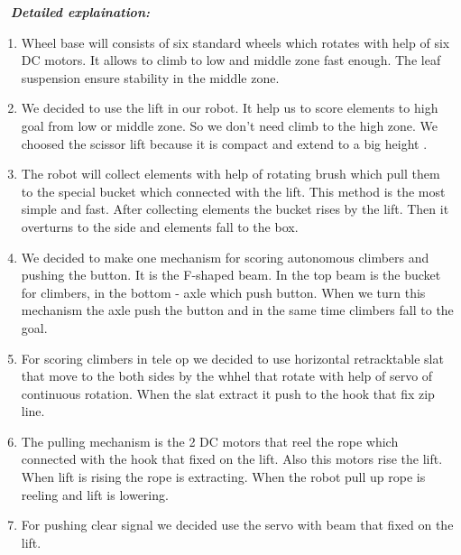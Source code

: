  \newline
\textit{\textbf{Detailed explaination:}}
\begin{enumerate}
	\item Wheel base will consists of six standard wheels which rotates with help of six DC motors. It allows to climb to low and middle zone fast enough. The leaf suspension ensure stability in the middle zone.
	
	\item We decided to use the lift in our robot. It help us to score elements to high goal from low or middle zone. So we don't need climb to the high zone. We choosed the scissor lift because it is compact and extend to a big height .
	
	\item The robot will collect elements with help of rotating brush which pull them to the special bucket which connected with the lift. This method is the most simple and fast. After collecting elements the bucket rises by the lift. Then it overturns to the side and elements fall to the box.
	
	\item We decided to make one mechanism for scoring autonomous climbers and pushing the button. It is the F-shaped beam. In the top beam is the bucket for climbers, in the bottom - axle which push button. When we turn this mechanism the axle push the button and in the same time climbers fall to the goal.
	
	\item For scoring climbers in tele op we decided to use horizontal retracktable slat that move to the both sides by the whhel that rotate with help of servo of continuous rotation. When the slat extract it push to the hook that fix zip line.
	
	\item The pulling mechanism is the 2 DC motors that reel the rope which connected with the hook that fixed on the lift. Also this motors rise the lift. When lift is rising the rope is extracting. When the robot pull up rope is reeling and lift is lowering. 
	
	\item For pushing clear signal we decided use the servo with beam that fixed on the lift.

	
\end{enumerate}

 \newline


\fillpage
